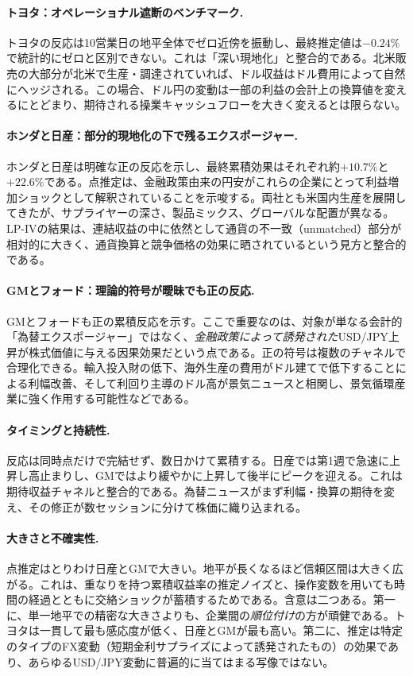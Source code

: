 \documentclass[12pt,a4paper]{article}
\begin{document}
\paragraph{トヨタ：オペレーショナル遮断のベンチマーク.}
トヨタの反応は10営業日の地平全体でゼロ近傍を振動し、最終推定値は$-0.24\%$で統計的にゼロと区別できない。これは「深い現地化」と整合的である。北米販売の大部分が北米で生産・調達されていれば、ドル収益はドル費用によって自然にヘッジされる。この場合、ドル円の変動は一部の利益の会計上の換算値を変えるにとどまり、期待される操業キャッシュフローを大きく変えるとは限らない。

\paragraph{ホンダと日産：部分的現地化の下で残るエクスポージャー.}
ホンダと日産は明確な正の反応を示し、最終累積効果はそれぞれ約$+10.7\%$と$+22.6\%$である。点推定は、金融政策由来の円安がこれらの企業にとって利益増加ショックとして解釈されていることを示唆する。両社とも米国内生産を展開してきたが、サプライヤーの深さ、製品ミックス、グローバルな配置が異なる。LP-IVの結果は、連結収益の中に依然として通貨の不一致（unmatched）部分が相対的に大きく、通貨換算と競争価格の効果に晒されているという見方と整合的である。

\paragraph{GMとフォード：理論的符号が曖昧でも正の反応.}
GMとフォードも正の累積反応を示す。ここで重要なのは、対象が単なる会計的「為替エクスポージャー」ではなく、\emph{金融政策によって誘発された}USD/JPY上昇が株式価値に与える因果効果だという点である。正の符号は複数のチャネルで合理化できる。輸入投入財の低下、海外生産の費用がドル建てで低下することによる利幅改善、そして利回り主導のドル高が景気ニュースと相関し、景気循環産業に強く作用する可能性などである。

\paragraph{タイミングと持続性.}
反応は同時点だけで完結せず、数日かけて累積する。日産では第1週で急速に上昇し高止まりし、GMではより緩やかに上昇して後半にピークを迎える。これは期待収益チャネルと整合的である。為替ニュースがまず利幅・換算の期待を変え、その修正が数セッションに分けて株価に織り込まれる。

\paragraph{大きさと不確実性.}
点推定はとりわけ日産とGMで大きい。地平が長くなるほど信頼区間は大きく広がる。これは、重なりを持つ累積収益率の推定ノイズと、操作変数を用いても時間の経過とともに交絡ショックが蓄積するためである。含意は二つある。第一に、単一地平での精密な大きさよりも、企業間の\emph{順位付け}の方が頑健である。トヨタは一貫して最も感応度が低く、日産とGMが最も高い。第二に、推定は特定のタイプのFX変動（短期金利サプライズによって誘発されたもの）の効果であり、あらゆるUSD/JPY変動に普遍的に当てはまる写像ではない。
\end{document}
